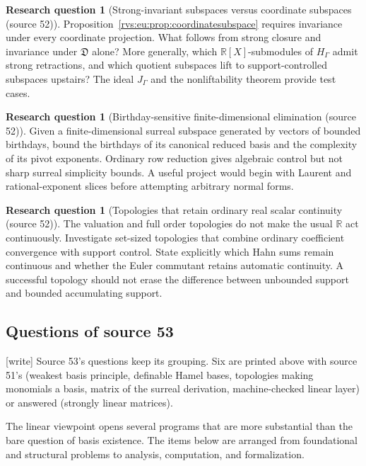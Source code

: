 \documentclass[11pt,letterpaper]{article}
\numberwithin{equation}{section}
\theoremstyle{definition}
\newtheorem{question}[theorem]{Research question}
\theoremstyle{remark}
\newcommand{\R}{\mathbb{R}}
\newcommand{\EuD}{\mathfrak D}%
\newcommand{\wtag}{\textup{[write]}}%
\begin{document}
\begin{question}[Strong-invariant subspaces versus coordinate subspaces (source 52)]
Proposition~\ref{rvs:eu:prop:coordinatesubspace} requires invariance under every coordinate projection. What follows from strong closure and invariance under $\EuD$ alone? More generally, which $\R[X]$-submodules of $H_\Gamma$ admit strong retractions, and which quotient subspaces lift to support-controlled subspaces upstairs? The ideal $J_\Gamma$ and the nonliftability theorem provide test cases.
\end{question}

\begin{question}[Birthday-sensitive finite-dimensional elimination (source 52)]
Given a finite-dimensional surreal subspace generated by vectors of bounded birthdays, bound the birthdays of its canonical reduced basis and the complexity of its pivot exponents. Ordinary row reduction gives algebraic control but not sharp surreal simplicity bounds. A useful project would begin with Laurent and rational-exponent slices before attempting arbitrary normal forms.
\end{question}

\begin{question}[Topologies that retain ordinary real scalar continuity (source 52)]
The valuation and full order topologies do not make the usual $\R$ act continuously. Investigate set-sized topologies that combine ordinary coefficient convergence with support control. State explicitly which Hahn sums remain continuous and whether the Euler commutant retains automatic continuity. A successful topology should not erase the difference between unbounded support and bounded accumulating support.
\end{question}


\subsection{Questions of source 53}

\noindent\wtag{} Source 53's questions keep its grouping.  Six are printed
above with source 51's (weakest basis principle, definable Hamel bases,
topologies making monomials a basis, matrix of the surreal derivation,
machine-checked linear layer) or answered (strongly linear matrices).

The linear viewpoint opens several programs that are more substantial than the
bare question of basis existence. The items below are arranged from foundational
and structural problems to analysis, computation, and formalization.
\end{document}
